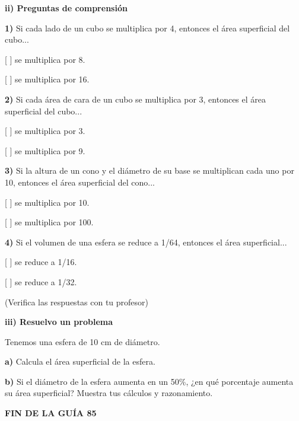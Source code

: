 \documentclass[12pt,a4paper]{article}
\begin{document}
\textbf{ii) Preguntas de comprensión}

\textbf{1)} Si cada lado de un cubo se multiplica por 4, entonces el área superficial del cubo...

[ ] se multiplica por 8.

[ ] se multiplica por 16.

\textbf{2)} Si cada área de cara de un cubo se multiplica por 3, entonces el área superficial del cubo...

[ ] se multiplica por 3.

[ ] se multiplica por 9.

\textbf{3)} Si la altura de un cono y el diámetro de su base se multiplican cada uno por 10, entonces el área superficial del cono...

[ ] se multiplica por 10.

[ ] se multiplica por 100.

\textbf{4)} Si el volumen de una esfera se reduce a 1/64, entonces el área superficial...

[ ] se reduce a 1/16.

[ ] se reduce a 1/32.

(Verifica las respuestas con tu profesor)

\vspace{4mm}


\textbf{iii) Resuelvo un problema}

Tenemos una esfera de 10 cm de diámetro.

\textbf{a)} Calcula el área superficial de la esfera.

\textbf{b)} Si el diámetro de la esfera aumenta en un 50\%, ¿en qué porcentaje aumenta su área superficial? Muestra tus cálculos y razonamiento.

\vfill

\begin{center}
\textbf{FIN DE LA GUÍA 85}
\end{center}

\end{document}
